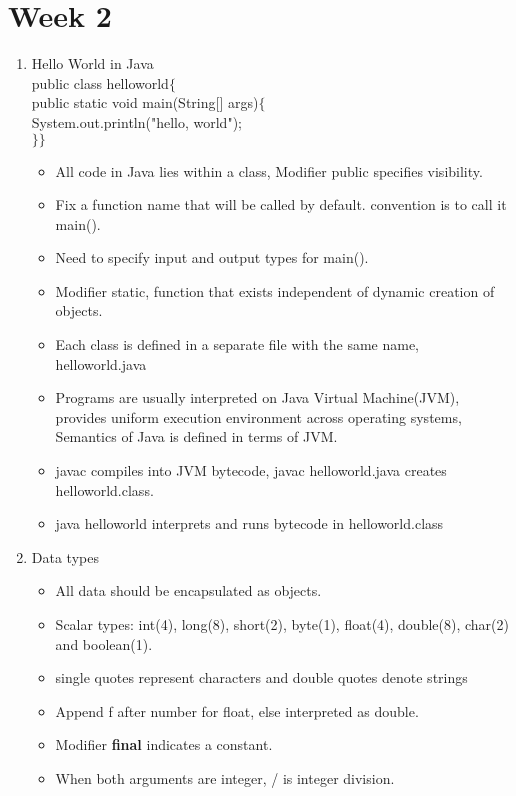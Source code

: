 \documentclass[a4paper]{article}
\begin{document}
\section{Week 2}
\begin{enumerate}
    \item Hello World in Java\\
    public class helloworld$\{$\\
    public static void main(String[] args)$\{$\\
    System.out.println("hello, world");\\
    $\}\}$
    \begin{itemize}
        \item All code in Java lies within a class, Modifier public specifies visibility.
        \item Fix a function name that will be called by default. convention is to call it main().
        \item Need to specify input and output types for main().
        \item Modifier static, function that exists independent of dynamic creation of objects.
        \item Each class is defined in a separate file with the same name, helloworld.java
        \item Programs are usually interpreted on Java Virtual Machine(JVM), provides uniform execution environment across operating systems, Semantics of Java is defined in terms of JVM.
        \item javac compiles into JVM bytecode, javac helloworld.java creates helloworld.class.
        \item java helloworld interprets and runs bytecode in helloworld.class
    \end{itemize}
    \item Data types
    \begin{itemize}
        \item All data should be encapsulated as objects.
        \item Scalar types: int(4), long(8), short(2), byte(1), float(4), double(8), char(2) and boolean(1).
        \item single quotes represent characters and double quotes denote strings
        \item Append f after number for float, else interpreted as double.
        \item Modifier \textbf{final} indicates a constant.
        \item When both arguments are integer, / is integer division.

\end{itemize}
\end{enumerate}
\end{document}
